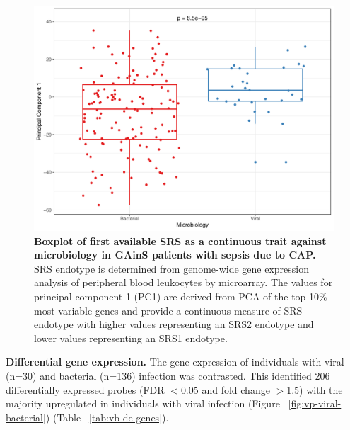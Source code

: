 \FloatBarrier
\begin{figure}[htbp]
\centering
\includegraphics[width=\textwidth]{./Results3/Images/viralSRS2.pdf}
\caption[Microbiology and SRS status]{\textbf{Boxplot of first available SRS as a continuous trait against microbiology in GAinS patients with sepsis due to CAP.} SRS endotype is determined from genome-wide gene expression analysis of peripheral blood leukocytes by microarray. The values for principal component 1 (PC1) are derived from PCA of the top 10\% most variable genes and provide a continuous measure of SRS endotype with higher values representing an SRS2 endotype and lower values representing an SRS1 endotype.}
\label{fig:viralsrs2}
\end{figure}
\FloatBarrier

\textbf{Differential gene expression.} The gene expression of individuals with viral (n=30) and bacterial (n=136) infection was contrasted. This identified 206 differentially expressed probes (FDR $<$0.05 and fold change $>$1.5) with the majority upregulated in individuals with viral infection (Figure ~\ref{fig:vp-viral-bacterial}) (Table ~\ref{tab:vb-de-genes}). 

